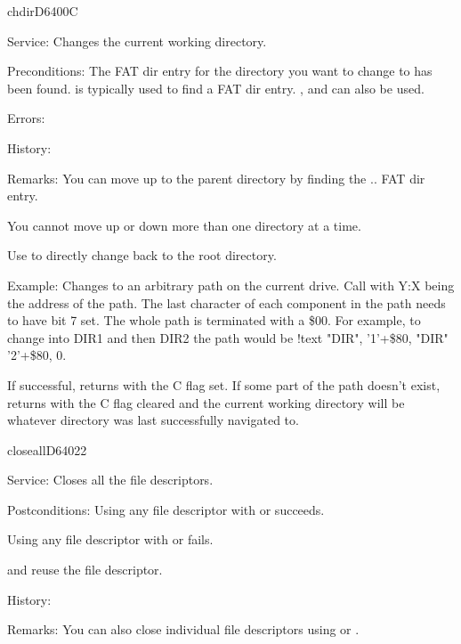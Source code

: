 \begin{hyppotrap}{chdir}{D640}{0C}
\item [Service:]
  Changes the current working directory.
\item [Preconditions:]
  The FAT dir entry for the directory you want to change to has been
  found.  is typically used to find a FAT dir entry.
  ,  and  can also be
  used.
\item [Errors:]
\item [History:]
\item [Remarks:]
  You can move up to the parent directory by finding the .. FAT dir entry.

  You cannot move up or down more than one directory at a time.

  Use  to directly change back to the root directory.
\item [Example:]
  Changes to an arbitrary path on the current drive. Call with Y:X being the
  address of the path. The last character of each component in the path needs
  to have bit 7 set. The whole path is terminated with a \$00. For example,
  to change into DIR1 and then DIR2 the path would be
  {\codefont !text "DIR", '1'+\$80, "DIR" '2'+\$80, 0}.

  If successful, returns with the C flag set. If some part of the path doesn't
  exist, returns with the C flag cleared and the current working directory will
  be whatever directory was last successfully navigated to.
\end{hyppotrap}


\newpage
\begin{hyppotrap}{closeall}{D640}{22}
\item [Service:]
  Closes all the file descriptors.
\item [Postconditions:]
  Using any file descriptor with  or 
  succeeds.

  Using any file descriptor with  or 
  fails.

   and  reuse the file descriptor.
\item [History:]
\item [Remarks:]
  You can also close individual file descriptors using  or
  .
\end{hyppotrap}


